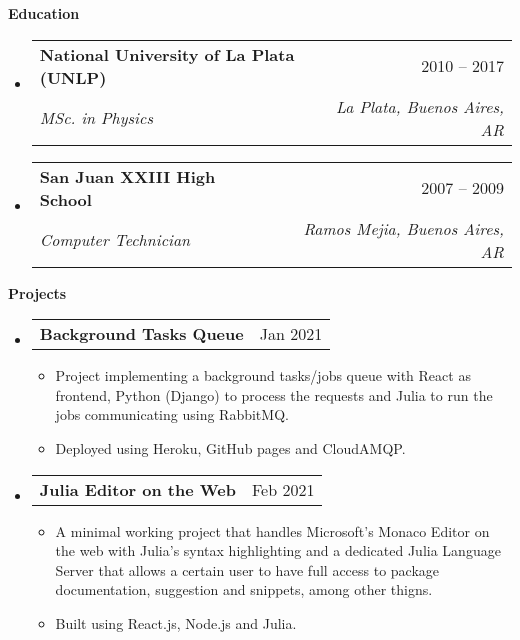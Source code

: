 \documentclass[letterpaper,12pt]{article}[leftmargin=*]
\makeatletter
\def \entryspacing {-0pt}
\renewcommand{\section}[2]{\vspace{5pt}
  \colorbox{secondary}{\color{white}\raggedbottom\normalsize\textbf{{#1}{\hspace{7pt}#2}}}
}
\newcommand{\resumeEntryStart}{\begin{itemize}[leftmargin=2.5mm]}
\newcommand{\resumeEntryEnd}{\end{itemize}\vspace{\entryspacing}}
\newcommand{\resumeItemListStart}{\begin{itemize}[leftmargin=4.5mm]}
\newcommand{\resumeItemListEnd}{\end{itemize}}
\newcommand{\resumeItem}[1]{
  \item\small{
    {#1 \vspace{-2pt}}
  }
}
\newcommand{\resumeEntryTSDL}[4]{
  \vspace{-1pt}\item[]
    \begin{tabularx}{0.97\textwidth}{X@{\hspace{60pt}}r}
      \textbf{\color{primary}#1} & {\firabook\color{accent}\small#2} \\
      \textit{\color{accent}\small#3} & \textit{\color{accent}\small#4} \\
    \end{tabularx}\vspace{-6pt}
}
\newcommand{\resumeEntryTD}[2]{
  \vspace{-1pt}\item[]
    \begin{tabularx}{0.97\textwidth}{X@{\hspace{60pt}}r}
      \textbf{\color{primary}#1} & {\firabook\color{accent}\small#2} \\
    \end{tabularx}\vspace{-6pt}
}
\makeatother
\begin{document}
  \newpage
\section{\faGraduationCap}{Education}

  \resumeEntryStart
    \resumeEntryTSDL
      {National University of La Plata (UNLP) \href{https://unlp.edu.ar/}{\faGlobe}}{2010 -- 2017}
      {MSc. in Physics}{La Plata, Buenos Aires, AR}
  \resumeEntryEnd

    \resumeEntryStart
    \resumeEntryTSDL
      {San Juan XXIII High School \href{http://parroquialjuan23.edu.ar/}{\faGlobe}}{2007 -- 2009}
      {Computer Technician}{Ramos Mejia, Buenos Aires, AR}
  \resumeEntryEnd

\section{\faFlask}{Projects}\href{https://mattborghi.github.io/projects/}{\faGlobe}

  \resumeEntryStart
  \resumeEntryTD
      {Background Tasks Queue \href{https://mattborghi.github.io/projects/Background\%20Task\%20Queues/}{\faGithub}}{Jan 2021}
    \resumeItemListStart
      \resumeItem {Project implementing a background tasks/jobs queue with React as frontend, Python (Django) to process the requests and Julia to run the jobs communicating using RabbitMQ.}
      \resumeItem{Deployed using Heroku, GitHub pages and CloudAMQP.}
  \resumeItemListEnd
  \resumeEntryEnd
  
   \resumeEntryStart
  \resumeEntryTD
      {Julia Editor on the Web \href{https://mattborghi.github.io/projects/Julia\%20Editor\%20on\%20the\%20Web/}{\faGithub}}{Feb 2021}
    \resumeItemListStart
      \resumeItem {A minimal working project that handles Microsoft’s Monaco Editor on the web with Julia’s syntax highlighting and a dedicated Julia Language Server that allows a certain user to have full access to package documentation, suggestion and snippets, among other thigns.}
      \resumeItem{Built using React.js, Node.js and Julia.}
  \resumeItemListEnd
  \resumeEntryEnd
  
\end{document}
